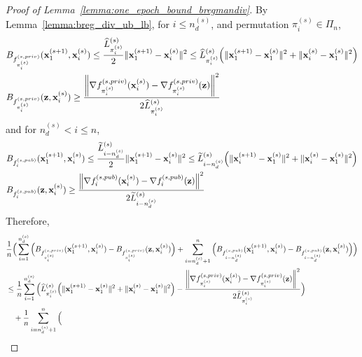 \begin{proof}[Proof of Lemma~\ref{lemma:one_epoch_bound_bregmandiv}]

    By Lemma~\ref{lemma:breg_div_ub_lb}, for $i \leq n_d^{(s)}$, and permutation $\pi_i^{(s)} \in \Pi_n$,
    \begin{align}
        &B_{f_{\pi_i^{(s)}}^{(s, priv)}} ({\mathbf{x}}_{1}^{(s+1)}, {\mathbf{x}}_i^{(s)}) \leq \frac{\widehat{L}_{\pi_i^{(s)}}^{(s)}}{2} \|{\mathbf{x}}_{1}^{(s+1)} - {\mathbf{x}}_{i}^{(s)}\|^2
        \leq \widehat{L}_{\pi_i^{(s)}}^{(s)} \Big( \|{\mathbf{x}}_{1}^{(s+1)} - {\mathbf{x}}_1^{(s)}\|^2 + \|{\mathbf{x}}_i^{(s)} - {\mathbf{x}}_1^{(s)} \|^2 \Big)\\
        &B_{f_{\pi_i^{(s)}}^{(s, priv)}} ({\mathbf{z}}, {\mathbf{x}}_i^{(s)})
        \geq \frac{\left\|\nabla f_{\pi_i^{(s)}}^{(s, priv)}({\mathbf{x}}_i^{(s)}) - \nabla f_{\pi_i^{(s)}}^{(s, priv)}({\mathbf{z}}) \right\|^2}{2 \widehat{L}_{\pi_i^{(s)}}^{(s)}}
    \end{align}
    and for $n_d^{(s)} < i \leq n$,
    \begin{align}
        &B_{f_{i}^{(s, pub)}}({\mathbf{x}}_1^{(s+1)}, {\mathbf{x}}_i^{(s)})
        \leq \frac{\widetilde{L}_{i-n_d^{(s)}}^{(s)}}{2}
        \|{\mathbf{x}}_1^{(s+1)} - {\mathbf{x}}_i^{(s)}\|^2
        \leq \widetilde{L}_{i-n_d^{(s)}}^{(s)}\Big(
            \|{\mathbf{x}}_i^{(s+1)} - {\mathbf{x}}_1^{(s)}\|^2
            + \|{\mathbf{x}}_i^{(s)} - {\mathbf{x}}_1^{(s)}\|^2
        \Big)\\
        &B_{f_{i}^{(s, pub)}}({\mathbf{z}}, {\mathbf{x}}_i^{(s)})
        \geq \frac{\left\| \nabla f_{i}^{(s, pub)}({\mathbf{x}}_i^{(s)}) - \nabla f_{i}^{(s, pub)}({\mathbf{z}}) \right\|^2}{2\widetilde{L}_{i-n_d^{(s)}}^{(s)}}
    \end{align}
    Therefore,
    \begin{align}
        &\frac{1}{n} \Big(\sum_{i=1}^{n_d^{(s)}}
        \Big( B_{f_{\pi_i^{(s)}}^{(s, priv)}}(\rvx_{1}^{(s+1)}, \rvx_i^{(s)})
        - B_{f_{\pi_i^{(s)}}^{(s, priv)}}(\rvz, \rvx_i^{(s)}) \Big)
        + \sum_{i=n_d^{(s)}+1}^{n}\Big(
            B_{f_{i-n_d^{(s)}}^{(s,pub)}}(\rvx_1^{(s+1)}, \rvx_i^{(s)})
            - B_{f_{i-n_d^{(s)}}^{(s, pub)}}(\rvz, \rvx_i^{(s)})
        \Big)
        \Big) \\
        \nonumber
        &\leq \frac{1}{n}\sum_{i=1}^{n_d^{(s)}}
        \Big( \widehat{L}_{\pi_i^{(s)}}^{(s)} \Big(\|\rvx_{1}^{(s+1)} - \rvx_1^{(s)}\|^2 + \|\rvx_i^{(s)} - \rvx_1^{(s)}\|^2 \Big)
        - \frac{ \left\|\nabla f_{\pi_i^{(s)}}^{(s, priv)}(\rvx_i^{(s)}) - \nabla f_{\pi_i^{(s)}}^{(s, priv)}(\rvz) \right\|^2}{2 \widehat{L}_{\pi_i^{(s)}}^{(s)}}
        \Big)\\
        \nonumber
        &\quad + \frac{1}{n}\sum_{i=n_d^{(s)}+1}^{n}\Big(

\end{align}
\end{proof}
